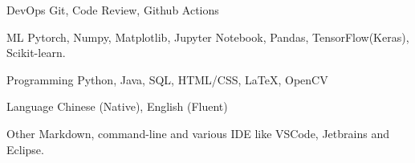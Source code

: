 

\begin{cvskills}

  \cvskill
    {DevOps} %
    {Git, Code Review, Github Actions} %


  \cvskill
    {ML} %
    {Pytorch, Numpy, Matplotlib, Jupyter Notebook, Pandas, TensorFlow(Keras), Scikit-learn.} %

  \cvskill
    {Programming} %
    {Python, Java, SQL, HTML/CSS, LaTeX, OpenCV} %

  \cvskill
    {Language} %
    {Chinese (Native), English (Fluent)} %

  \cvskill
    {Other} %
    {Markdown, command-line and various IDE like VSCode, Jetbrains and Eclipse.} %

\end{cvskills}
